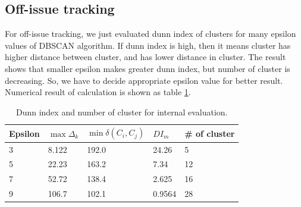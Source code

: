 \subsection{Off-issue tracking}

For off-issue tracking, we just evaluated dunn index of clusters for many epsilon values of DBSCAN algorithm.
If dunn index is high, then it means cluster has higher distance between cluster, and has lower distance in cluster.
The result shows that smaller epsilon makes greater dunn index, but number of cluster is decreasing. So,
we have to decide appropriate epsilon value for better result. Numerical result of calculation is shown as table \ref{table:dunnindex}.
\begin{table}[!htbp]
  \begin{tabular}{l|l|l|l|l}
  Epsilon   & $\max \Delta_{k}$ & $\min \delta(C_{i}, C_{j})$ & $DI_{m}$ & \# of cluster \\ \hline
  3 &  8.122 & 192.0 & 24.26 & 5 \\
  5 &  22.23 & 163.2 & 7.34 & 12 \\
  7 &  52.72 & 138.4 & 2.625 & 16  \\
  9 & 106.7 & 102.1 & 0.9564 & 28
  \end{tabular}
  \caption{Dunn index and number of cluster for internal evaluation.}
  \label{table:dunnindex}
\end{table}
